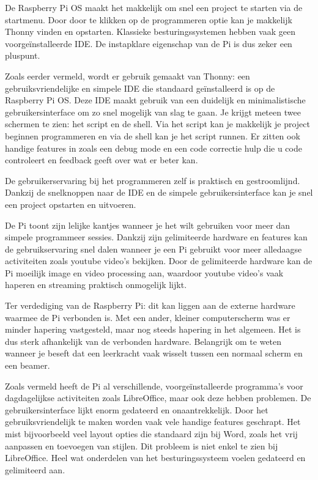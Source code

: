 De Raspberry Pi OS maakt het makkelijk om snel een project te starten via de startmenu. Door door te klikken op de programmeren optie kan je makkelijk Thonny vinden en opstarten. Klassieke besturingssystemen hebben vaak geen voorgeïnstalleerde IDE. De instapklare eigenschap van de Pi is dus zeker een pluspunt. 

Zoals eerder vermeld, wordt er gebruik gemaakt van Thonny: een gebruiksvriendelijke en simpele IDE die standaard geïnstalleerd is op de Raspberry Pi OS. Deze IDE maakt gebruik van een duidelijk en minimalistische gebruikersinterface om zo snel mogelijk van slag te gaan. Je krijgt meteen twee schermen te zien: het script en de shell. Via het script kan je makkelijk je project beginnen programmeren en via de shell kan je het script runnen. Er zitten ook handige features in zoals een debug mode en een code correctie hulp die u code controleert en feedback geeft over wat er beter kan. 

De gebruikerservaring bij het programmeren zelf is praktisch en gestroomlijnd. Dankzij de snelknoppen naar de IDE en de simpele gebruikersinterface kan je snel een project opstarten en uitvoeren.


De Pi toont zijn lelijke kantjes wanneer je het wilt gebruiken voor meer dan simpele programmeer sessies. Dankzij zijn gelimiteerde hardware en features kan de gebruikservaring snel dalen wanneer je een Pi gebruikt voor meer alledaagse activiteiten zoals youtube video’s bekijken. Door de gelimiteerde hardware kan de Pi moeilijk image en video processing aan, waardoor youtube video’s vaak haperen en streaming praktisch onmogelijk lijkt. 

Ter verdediging van de Raspberry Pi: dit kan liggen aan de externe hardware waarmee de Pi verbonden is. Met een ander, kleiner computerscherm was er minder hapering vastgesteld, maar nog steeds hapering in het algemeen. Het is dus sterk afhankelijk van de verbonden hardware. Belangrijk om te weten wanneer je beseft dat een leerkracht vaak wisselt tussen een normaal scherm en een beamer.

Zoals vermeld heeft de Pi al verschillende, voorgeïnstalleerde programma's voor dagdagelijkse activiteiten zoals LibreOffice, maar ook deze hebben problemen. De gebruikersinterface lijkt enorm gedateerd en onaantrekkelijk. Door het gebruiksvriendelijk te maken worden vaak vele handige features geschrapt. Het mist bijvoorbeeld veel layout opties die standaard zijn bij Word, zoals het vrij aanpassen en toevoegen van stijlen. 
Dit probleem is niet enkel te zien bij LibreOffice. Heel wat onderdelen van het besturingssysteem voelen gedateerd en gelimiteerd aan. 

